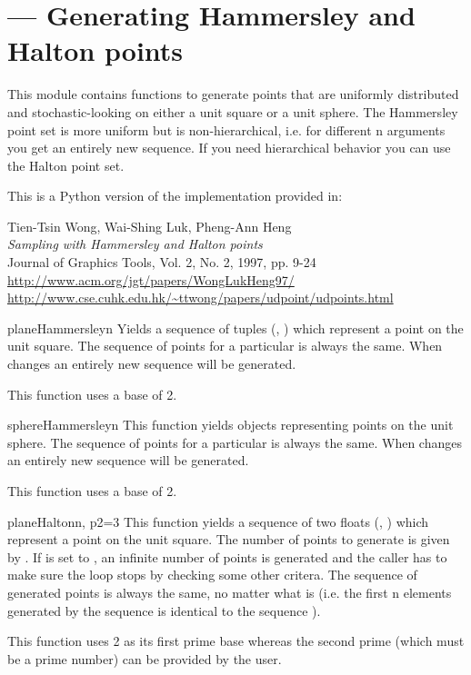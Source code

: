 
\section{ ---
          Generating Hammersley and Halton points}


This module contains functions to generate points that are uniformly
distributed and stochastic-looking on either a unit square or a unit
sphere. The Hammersley point set is more uniform but is
non-hierarchical, i.e. for different n arguments you get an entirely
new sequence. If you need hierarchical behavior you can use the Halton
point set.

This is a Python version of the implementation provided in:

Tien-Tsin Wong, Wai-Shing Luk, Pheng-Ann Heng\\
{\em Sampling with Hammersley and Halton points}\\
Journal of Graphics Tools, Vol. 2, No. 2, 1997, pp. 9-24\\
\url{http://www.acm.org/jgt/papers/WongLukHeng97/}\\
\url{http://www.cse.cuhk.edu.hk/~ttwong/papers/udpoint/udpoints.html}

\begin{funcdesc}{planeHammersley}{n}
Yields a sequence of  tuples (, ) which represent a
point on the unit square. The sequence of points for a particular  is
always the same. When  changes an entirely new sequence will be
generated.
    
This function uses a base of 2.
\end{funcdesc}

\begin{funcdesc}{sphereHammersley}{n}
This function yields   objects representing points
on the unit sphere. The sequence of points for a particular  is
always the same. When  changes an entirely new sequence will be
generated.

This function uses a base of 2.    
\end{funcdesc}

\begin{funcdesc}{planeHalton}{n, p2=3}
This function yields a sequence of two floats (, ) which
represent a point on the unit square. The number of points to generate
is given by . If  is set to , an infinite
number of points is generated and the caller has to make sure the loop
stops by checking some other critera.  The sequence of generated
points is always the same, no matter what  is (i.e. the first n
elements generated by the sequence  is identical to
the sequence ).

This function uses 2 as its first prime base whereas the second
prime  (which must be a prime number) can be provided by the user.
\end{funcdesc}

